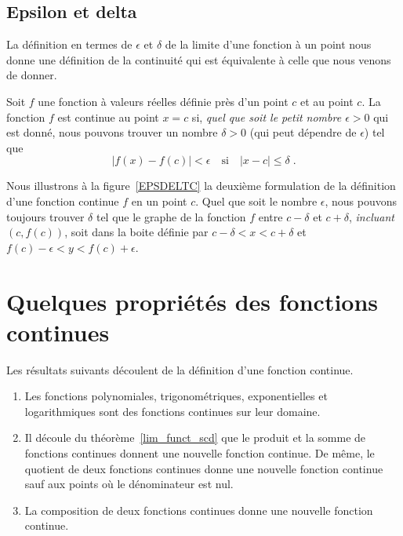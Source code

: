 {\subsection{Epsilon et delta \theory}

La définition en termes de $\epsilon$ et $\delta$ de la limite d'une
fonction à un point nous donne une définition de la continuité qui est
équivalente à celle que nous venons de donner.

\begin{defn} 
Soit $f$ une fonction à valeurs réelles définie près d'un point $c$ et
au point $c$.  La fonction $f$ est continue au point $x=c$ si,
{\em quel que soit le petit nombre $\epsilon >0$} qui est donné, nous
pouvons trouver un nombre $\delta >0$ (qui peut dépendre de $\epsilon$)
tel que
\[
|f(x) - f(c)| < \epsilon \quad \text{si} \quad |x-c|\leq \delta \; .
\]
\end{defn}

\begin{rmk}
Nous illustrons à la figure~\ref{EPSDELTC} la deuxième formulation de la
définition d'une fonction continue $f$ en un point $c$.  Quel que soit
le nombre $\epsilon$, nous pouvons toujours trouver $\delta$ tel que le
graphe de la fonction $f$ entre $c-\delta$ et $c+\delta$,
{\em incluant $(c,f(c))$}, soit dans la boite définie par
$c-\delta < x < c+\delta$ et $f(c)-\epsilon < y < f(c)+\epsilon$.
\end{rmk}


\section{Quelques propriétés des fonctions continues}

Les résultats suivants découlent de la définition d'une fonction continue.

\begin{prop}
\begin{enumerate}
\item Les fonctions polynomiales, trigonométriques, exponentielles et
  logarithmiques sont des fonctions continues sur leur domaine.
\item Il découle du théorème~\ref{lim_funct_scd} que le produit et la
  somme de fonctions continues donnent une nouvelle fonction continue.
  De même, le quotient de deux fonctions continues donne une nouvelle
  fonction continue sauf aux points où le dénominateur est nul.
\item La composition de deux fonctions continues donne une nouvelle
  fonction continue.
\end{enumerate}
\end{prop}

}
